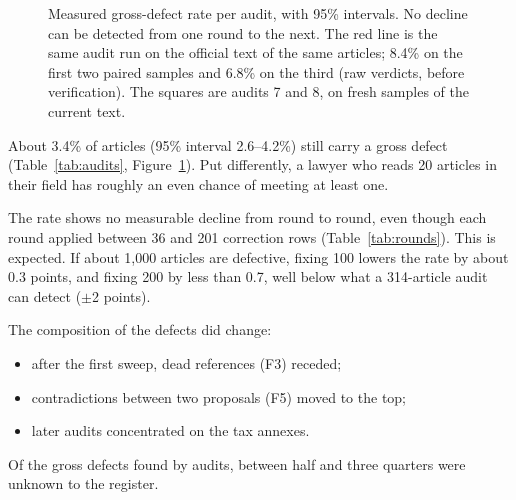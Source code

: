 \documentclass[11pt,a4paper]{article}
\begin{document}
\begin{figure}[ht]
\centering
{}
\caption{Measured gross-defect rate per audit, with 95\% intervals. No decline can be detected from one round to the next. The red line is the same audit run on the official text of the same articles; 8.4\% on the first two paired samples and 6.8\% on the third (raw verdicts, before verification). The squares are audits 7 and 8, on fresh samples of the current text.}
\label{fig:audits}
\end{figure}

About 3.4\% of articles (95\% interval 2.6--4.2\%) still carry a gross defect (Table~\ref{tab:audits}, Figure~\ref{fig:audits}). Put differently, a lawyer who reads 20 articles in their field has roughly an even chance of meeting at least one.

The rate shows no measurable decline from round to round, even though each round applied between 36 and 201 correction rows (Table~\ref{tab:rounds}). This is expected. If about 1{,}000 articles are defective, fixing 100 lowers the rate by about 0.3 points, and fixing 200 by less than 0.7, well below what a 314-article audit can detect ($\pm$2 points).

The composition of the defects did change:
\begin{itemize}
  \item after the first sweep, dead references (F3) receded;
  \item contradictions between two proposals (F5) moved to the top;
  \item later audits concentrated on the tax annexes.
\end{itemize}
Of the gross defects found by audits, between half and three quarters were unknown to the register.
\end{document}
